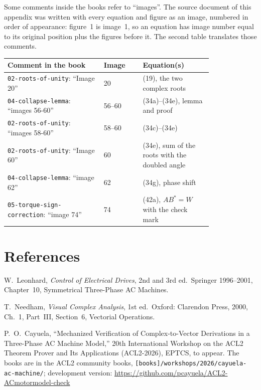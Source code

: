 \documentclass[11pt,a4paper]{article}
\begin{document}
Some comments inside the books refer to ``images''. The source document of this appendix was written with every equation and figure as an image, numbered in order of appearance: figure~1 is image~1, so an equation has image number equal to its original position plus the figures before it. The second table translates those comments.

\begin{center}\small
\begin{tabular}{@{}p{0.47\linewidth}lp{0.34\linewidth}@{}}
\toprule
Comment in the book & Image & Equation(s)\\
\midrule
\texttt{02-roots-of-unity}: ``Image 20'' & 20 & (19), the two complex roots\\
\texttt{04-collapse-lemma}: ``images 56-60'' & 56--60 & (34a)--(34e), lemma and proof\\
\texttt{02-roots-of-unity}: ``images 58-60'' & 58--60 & (34c)--(34e)\\
\texttt{02-roots-of-unity}: ``Image 60'' & 60 & (34e), sum of the roots with the doubled angle\\
\texttt{04-collapse-lemma}: ``image 62'' & 62 & (34g), phase shift\\
\texttt{05-torque-sign-correction}: ``image 74'' & 74 & (42a), $AB^{*}=W$ with the check mark\\
\bottomrule
\end{tabular}
\end{center}


\section*{References}
\begin{description}\setlength{\itemsep}{0.1em}
\item[{[1]}] W.~Leonhard, \emph{Control of Electrical Drives}, 2nd and 3rd ed.\ Springer 1996--2001, Chapter~10, Symmetrical Three-Phase AC Machines.
\item[{[2]}] T.~Needham, \emph{Visual Complex Analysis}, 1st ed.\ Oxford: Clarendon Press, 2000, Ch.~1, Part~III, Section~6, Vectorial Operations.
\item[{[3]}] P.~O.~Cayuela, ``Mechanized Verification of Complex-to-Vector Derivations in a Three-Phase AC Machine Model,'' 20th International Workshop on the ACL2 Theorem Prover and Its Applications (ACL2-2026), EPTCS, to appear. The books are in the ACL2 community books, \texttt{[books]/workshops/2026/cayuela-ac-machine/}; development version: \url{https://github.com/pcayuela/ACL2-ACmotormodel-check}
\end{description}
\end{document}
